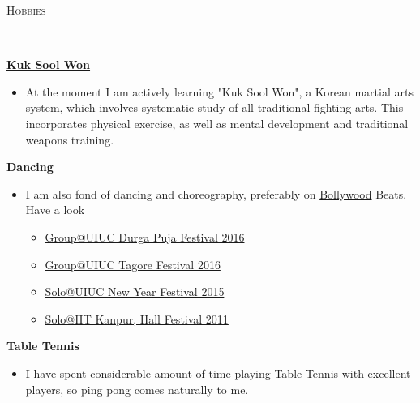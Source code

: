 \documentclass[9pt]{article}
\newenvironment{changemargin}[2]{%
  \begin{list}{}{%
    \setlength{\topsep}{0pt}%
    \setlength{\leftmargin}{#1}%
    \setlength{\rightmargin}{#2}%
    \setlength{\listparindent}{\parindent}%
    \setlength{\itemindent}{\parindent}%
    \setlength{\parsep}{\parskip}%
  }%
  \item[]}{\end{list}
}
\newcommand{\lineover}{
	\begin{changemargin}{-0.05in}{-0.05in}
		\vspace*{-8pt}
		\hrulefill \\
		\vspace*{-2pt}
	\end{changemargin}
}
\newcommand{\header}[1]{
	\begin{changemargin}{-0.5in}{-0.5in}
		\scshape{#1}\\
  	\lineover
	\end{changemargin}
}
\newenvironment{body} {
	\vspace*{-16pt}
	\begin{changemargin}{-0.25in}{-0.5in}
  }	
	{\end{changemargin}
}
\begin{document}
\smallskip

\header{Hobbies}

\begin{body}
	\vspace{14pt}

	\href{https://en.wikipedia.org/wiki/Kuk\_Sool\_Won}{\textbf{Kuk Sool Won}}\\
	\vspace*{-4pt}
	\begin{itemize} \itemsep -0pt  %
                \item  

                  At the moment I am actively learning "Kuk Sool Won", a Korean
                  martial arts system, which involves systematic study of all
                  traditional fighting arts. This incorporates physical
                  exercise, as well as mental development and traditional
                  weapons training.
                  
                \end{itemize}

	\textbf{Dancing}\\
	\vspace*{-4pt}
	\begin{itemize} \itemsep -0pt  %
            \item I am also fond of dancing and choreography, preferably on \href{https://en.wikipedia.org/wiki/Bollywood}{Bollywood} Beats. Have a look
	        \begin{itemize} \itemsep -0pt  %
                    \item \href{https://www.youtube.com/watch?v=jx-HcAEbJaw&feature=youtu.be}{Group@UIUC Durga Puja Festival 2016}
                    \item \href{https://www.youtube.com/watch?v=PfqsE7sajm8&feature=youtu.be}{Group@UIUC Tagore Festival 2016}
                    \item \href{https://www.youtube.com/watch?v=XG6ViBPG7yE}{Solo@UIUC New Year Festival 2015}
                    \item \href{https://www.youtube.com/watch?v=F8xdb7LkSrw}{Solo@IIT Kanpur, Hall Festival 2011}
                \end{itemize}
         \end{itemize}

	\textbf{Table Tennis}\\
	\vspace*{-4pt}
	\begin{itemize} \itemsep -0pt  %
                \item  
                  I have spent considerable amount of time playing Table Tennis
                  with excellent players, so ping pong comes naturally  to me.
                \end{itemize}
\end{body}
\end{document}
